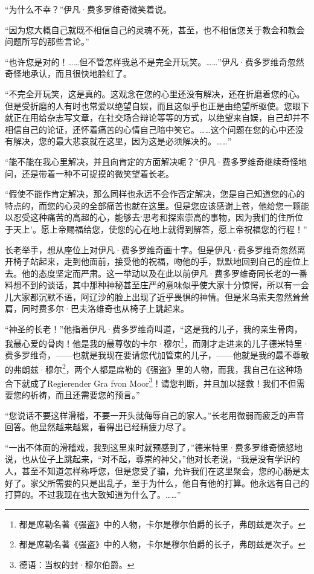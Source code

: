 \par “为什么不幸？”伊凡·费多罗维奇微笑着说。
\par “因为您大概自己就既不相信自己的灵魂不死，甚至，也不相信您关于教会和教会问题所写的那些言论。”
\par “也许您是对的！……但不管怎样我总不是完全开玩笑。……”伊凡·费多罗维奇忽然奇怪地承认，而且很快地脸红了。
\par “不完全开玩笑，这是真的。这观念在您的心里还没有解决，还在折磨着您的心。但是受折磨的人有时也常爱以绝望自娱，而且这似乎也正是由绝望所驱使。您眼下就正在用给杂志写文章，在社交场合辩论等等的方式，以绝望来自娱，自己却并不相信自己的论证，还怀着痛苦的心情自己暗中笑它。……这个问题在您的心中还没有解决，您的最大悲哀就在这里，因为这是必须解决的。……”
\par “能不能在我心里解决，并且向肯定的方面解决呢？”伊凡·费多罗维奇继续奇怪地问，还是带着一种不可捉摸的微笑望着长老。
\par “假使不能作肯定解决，那么同样也永远不会作否定解决，您是自己知道您的心的特点的，而您的心灵的全部痛苦也就在这里。但是您应该感谢上苍，他给您一颗能以忍受这种痛苦的高超的心，能够去‘思考和探索崇高的事物，因为我们的住所位于天上’。愿上帝赐福给您，使您的心在地上就得到解答，愿上帝祝福您的行程！”
\par 长老举手，想从座位上对伊凡·费多罗维奇画十字。但是伊凡·费多罗维奇忽然离开椅子站起来，走到他面前，接受他的祝福，吻他的手，默默地回到自己的座位上去。他的态度坚定而严肃。这一举动以及在此以前伊凡·费多罗维奇同长老的一番料想不到的谈话，其中那种神秘甚至庄严的意味似乎使大家十分惊愕，所以有一会儿大家都沉默不语，阿辽沙的脸上出现了近乎畏惧的神情。但是米乌索夫忽然耸耸肩，同时费多尔·巴夫洛维奇也从椅子上跳起来。
\par “神圣的长老！”他指着伊凡·费多罗维奇叫道，“这是我的儿子，我的亲生骨肉，我最心爱的骨肉！他是我的最尊敬的卡尔·穆尔\footnote{都是席勒名著《强盗》中的人物，卡尔是穆尔伯爵的长子，弗朗兹是次子。}，而刚才走进来的儿子德米特里·费多罗维奇，——也就是我现在要请您代加管束的儿子，——他就是我的最不尊敬的弗朗兹·穆尔\footnote{都是席勒名著《强盗》中的人物，卡尔是穆尔伯爵的长子，弗朗兹是次子。}，两个人都是席勒的《强盗》里的人物，而我，我自己在这种场合下就成了Regierender Gra fvon Moor\footnote{德语：当权的封·穆尔伯爵。}！请您判断，并且加以拯救！我们不但需要您的祈祷，而且还需要您的预言。”
\par “您说话不要这样滑稽，不要一开头就侮辱自己的家人。”长老用微弱而疲乏的声音回答。他显然越来越累，看得出已经精疲力尽了。
\par “一出不体面的滑稽戏，我到这里来时就预感到了，”德米特里·费多罗维奇愤怒地说，也从位子上跳起来，“对不起，尊崇的神父，”他对长老说，“我是没有学识的人，甚至不知道怎样称呼您，但是您受了骗，允许我们在这里聚会，您的心肠是太好了。家父所需要的只是出乱子，至于为什么，他自有他的打算。他永远有自己的打算的。不过我现在也大致知道为什么了。……”
